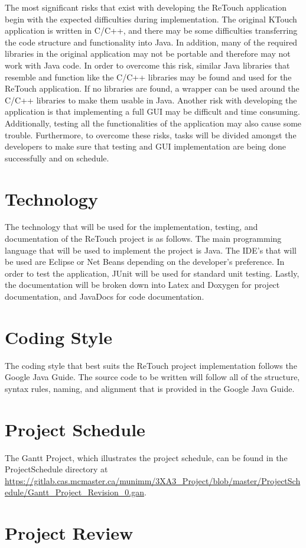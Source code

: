 \documentclass{article}
\begin{document}
    The most significant risks that exist with developing the ReTouch application begin with the expected difficulties during implementation. The original KTouch application is written in C/C++, and there may be some difficulties transferring the code structure and functionality into Java. In addition, many of the required libraries in the original application may not be portable and therefore may not work with Java code. In order to overcome this risk, similar Java libraries that resemble and function like the C/C++ libraries may be found and used for the ReTouch application. If no libraries are found, a wrapper can be used around the C/C++ libraries to make them usable in Java. Another risk with developing the application is that implementing a full GUI may be difficult and time consuming. Additionally, testing all the functionalities of the application may also cause some trouble. Furthermore, to overcome these risks, tasks will be divided amongst the developers to make sure that testing and GUI implementation are being done successfully and on schedule.


\section{Technology}

    The technology that will be used for the implementation, testing, and documentation of the ReTouch project is as follows. The main programming language that will be used to implement the project is Java. The IDE's that will be used are Eclipse or Net Beans depending on the developer's preference. In order to test the application, JUnit will be used for standard unit testing. Lastly, the documentation will be broken down into Latex and Doxygen for project documentation, and JavaDocs for code documentation.

\section{Coding Style}

    The coding style that best suits the ReTouch project implementation follows the Google Java Guide. The source code to be written will follow all of the structure, syntax rules, naming, and alignment that is provided in the Google Java Guide. 

\section{Project Schedule}

The Gantt Project, which illustrates the project schedule, can be found in the ProjectSchedule directory at \url{https://gitlab.cas.mcmaster.ca/munimm/3XA3_Project/blob/master/ProjectSchedule/Gantt_Project_Revision_0.gan}. 


\section{Project Review}
\end{document}
